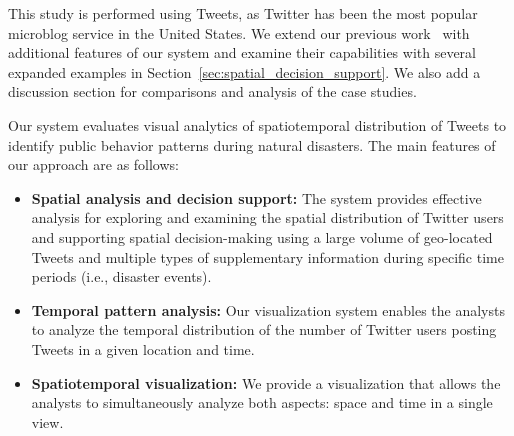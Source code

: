 This study is performed using Tweets, as Twitter has been the most popular microblog service in the United States.
We extend our previous work~\cite{Chae:2013:VAM} with additional features of our system and examine their capabilities with several expanded examples in Section~\ref{sec:spatial_decision_support}.
We also add a discussion section for comparisons and analysis of the case studies.

Our system evaluates visual analytics of spatiotemporal distribution of Tweets to identify public behavior patterns during natural disasters.
The main features of our approach are as follows:
\begin{itemize}
	\item \textbf{Spatial analysis and decision support:} The system provides effective analysis for exploring and examining the spatial distribution of Twitter users and supporting spatial decision-making using a large volume of geo-located Tweets and multiple types of supplementary information during specific time periods (i.e., disaster events).
\item \textbf{Temporal pattern analysis:} Our visualization system enables the analysts to analyze the temporal distribution of the number of Twitter users posting Tweets in a given location and time.
\item \textbf{Spatiotemporal visualization:} We provide a visualization that allows the analysts to simultaneously analyze both aspects: space and time in a single view.
\end{itemize}








